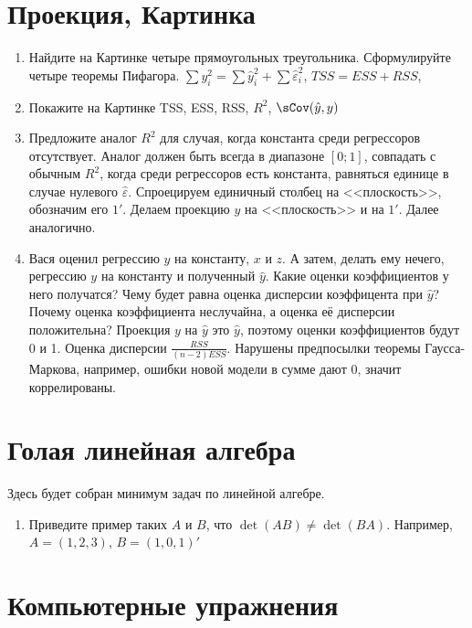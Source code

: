 \documentclass[pdftex,12pt,a4paper]{article}
\def \hy{\hat{y}}
\def \he{\hat{\varepsilon}}
\newcommand{\solution}[1]{ {\tiny #1} }
\newcommand{\problem}[1]{#1}
\begin{document}
\section{Проекция, Картинка}
\begin{enumerate}
\item Найдите на Картинке четыре прямоугольных треугольника. Сформулируйте четыре теоремы Пифагора.
\solution{$\sum y_i^2=\sum \hy_i^2+\sum \he_i^2$, $TSS=ESS+RSS$, }

\item Покажите на Картинке TSS, ESS, RSS, $R^2$, $\sCov(\hy,y)$
\solution{}


\item Предложите аналог $R^2$ для случая, когда константа среди регрессоров отсутствует. Аналог должен быть всегда в диапазоне $[0;1]$, совпадать с обычным $R^2$, когда среди регрессоров есть константа, равняться единице в случае нулевого $\he$.
\solution{Спроецируем единичный столбец на <<плоскость>>, обозначим его $1'$. Делаем проекцию $y$ на <<плоскость>> и на $1'$. Далее аналогично. }

\item Вася оценил регрессию $y$ на константу, $x$ и $z$. А затем, делать ему нечего, регрессию $y$ на константу и полученный $\hy$. Какие оценки коэффициентов у него получатся? Чему будет равна оценка дисперсии коэффицента при $\hy$? Почему оценка коэффициента неслучайна, а оценка её дисперсии положительна?
\solution{Проекция $y$ на $\hy$ это $\hy$, поэтому оценки коэффициентов будут 0 и 1. Оценка дисперсии $\frac{RSS}{(n-2)ESS}$. Нарушены предпосылки теоремы Гаусса-Маркова, например, ошибки новой модели в сумме дают 0, значит коррелированы. } 


\end{enumerate}


\section{Голая линейная алгебра}

Здесь будет собран минимум задач по линейной алгебре.

\begin{enumerate}
\item \problem{Приведите пример таких $A$ и $B$, что $\det(AB)\neq \det(BA)$.}
\solution{Например, $A=(1,2,3)$, $B=(1,0,1)'$}


 
\end{enumerate}


\section{Компьютерные упражнения}
\end{document}
